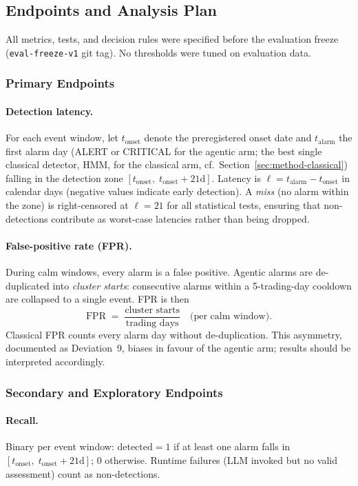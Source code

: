 \documentclass[11pt,a4paper]{article}
\begin{document}
\subsection{Endpoints and Analysis Plan}\label{sec:method-endpoints}
All metrics, tests, and decision rules were specified before the evaluation freeze (\texttt{eval-freeze-v1} git tag). No thresholds were tuned on
  evaluation data.

  \subsubsection{Primary Endpoints}

  \paragraph{Detection latency.}
  For each event window, let $t_\text{onset}$ denote the preregistered onset date
  and $t_\text{alarm}$ the first alarm day (ALERT or CRITICAL for the agentic
  arm; the best single classical detector, HMM, for the classical arm,
  cf.\ Section~\ref{sec:method-classical}) falling in the detection zone
  $[t_\text{onset},\; t_\text{onset} + 21\text{d}]$. Latency is
  $\ell = t_\text{alarm} - t_\text{onset}$ in calendar days (negative values
  indicate early detection). A \emph{miss} (no alarm within the zone) is
  right-censored at $\ell = 21$ for all statistical tests, ensuring that
  non-detections contribute as worst-case latencies rather than being dropped.

  \paragraph{False-positive rate (FPR).}
  During calm windows, every alarm is a false positive. Agentic alarms are
  de-duplicated into \emph{cluster starts}: consecutive alarms within a
  5-trading-day cooldown are collapsed to a single event. FPR is then
  \[
    \text{FPR} \;=\; \frac{\text{cluster starts}}{\text{trading days}}
    \quad\text{(per calm window).}
  \]
  Classical FPR counts every alarm day without de-duplication. This
  asymmetry, documented as Deviation~9, biases in favour of the agentic arm;
  results should be interpreted accordingly.

  \subsubsection{Secondary and Exploratory Endpoints}

  \paragraph{Recall.}
  Binary per event window: $\text{detected} = 1$ if at least one alarm falls in
  $[t_\text{onset},\; t_\text{onset} + 21\text{d}]$; 0 otherwise. Runtime
  failures (LLM invoked but no valid assessment) count as non-detections.
\end{document}
